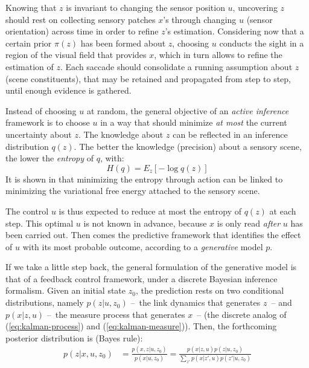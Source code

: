 \documentclass{article} %
\begin{document}
Knowing that $z$ is invariant to changing the sensor position $u$, uncovering $z$ should rest on
collecting sensory patches $x$'s through changing $u$ (sensor orientation) across time in order to refine $z$'s estimation. 
Considering now that a certain prior $\pi(z)$ has been formed about $z$, choosing  $u$ conducts the sight in a region of the visual field that provides $x$, which in turn allows to refine the estimation of $z$.
Each saccade should consolidate a running assumption about $z$ (scene constituents), that may be retained and propagated from step to step, until enough evidence is gathered.

Instead of choosing $u$ at random, the general objective of an \emph{active inference} framework is to choose $u$ in a way that should minimize \emph{at most} the current uncertainty about $z$. 
The knowledge about $z$ can be reflected in an inference distribution $q(z)$. The better the knowledge (precision) about a sensory scene, the lower the \emph{entropy} of $q$, with:
$$H(q) = E_z[- \log q(z)]$$
It is shown in \cite{friston2012perceptions} that minimizing the entropy through action can be linked to minimizing the variational free energy attached to the sensory scene. 




The control $u$ is thus expected to reduce at most the entropy of $q(z)$ at each step. This optimal $u$ is not known in advance, because $x$ is only read \emph{after} $u$ has been carried out. Then comes the predictive framework that identifies the effect of $u$ with its most probable outcome, according to a \emph{generative} model $p$.
	
If we take a little step back, the general formulation of the generative model is that of a feedback control framework, under a discrete Bayesian inference formalism. %
Given an initial state $z_0$, the prediction rests on two conditional distributions, namely $p(z|u,z_0)$ --~the link dynamics that generates $z$~-- and $p(x|z,u)$ --~the measure process that generates $x$~--  (the discrete analog of (\ref{eq:kalman-process}) and (\ref{eq:kalman-measure})). %
Then, the forthcoming posterior distribution is (Bayes rule):
	\begin{align*}
	p(z|x,u,z_0) &= \frac{p(x,z|u,z_0)}{p(x|u,z_0)}
	= \frac{p(x|z,u) p(z|u,z_0)}{\sum_{z'}p(x|z',u) p(z'|u,z_0)}
	\end{align*}
	
\end{document}
